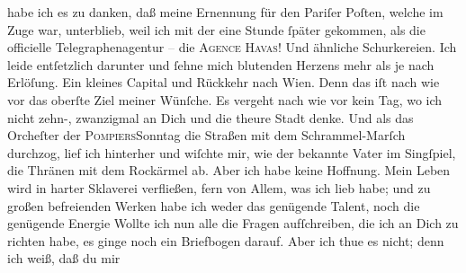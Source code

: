 \begin{ledgroupsized}[t]{13cm}
               habe ich es zu danken, daß \strikeout{\textcolor{gray}{man}} meine Ernennung für den Pariſer Poſten,
               welche im Zuge war, unterblieb, weil ich mit der \label{K_L02669-777v}\label{K_L02669-777h} eine Stunde ſpäter gekommen, als die officielle
               Telegraphenagentur \textcolor{gray}{–} die \textsc{Agence Havas}! Und ähnliche Schurkereien. Ich leide entſetzlich darunter und ſehne mich
               blutenden Herzens mehr als je nach Erlöſung. Ein kleines Capital und Rückkehr nach
                  Wien. Denn das iſt nach wie vor das oberſte
               Ziel meiner Wünſche. Es vergeht nach wie vor kein Tag, {\pb}wo ich nicht zehn-, zwanzigmal an Dich und die
               theure Stadt denke. Und als das
                  Orcheſter der \textsc{Pompiers}Sonntag die Straßen mit dem Schrammel-Marſch durchzog, lief ich
               hinterher und wiſchte mir, wie der bekannte Vater im Singſpiel, die Thränen mit dem Rockärmel
               ab. Aber ich habe keine Hoffnung. Mein Leben wird in harter Sklaverei verfließen,
               fern von Allem, was ich lieb habe; und zu großen befreienden Werken habe ich weder
               das genügende Talent, noch die genügende Energie{\dotsfive}\pend
           \pstart
           Wollte ich nun alle die Fragen aufſchreiben, die ich an Dich zu richten habe, es
               ginge noch ein Briefbogen darauf. Aber ich thue es nicht; denn ich weiß, daß du mir

\end{ledgroupsized}

